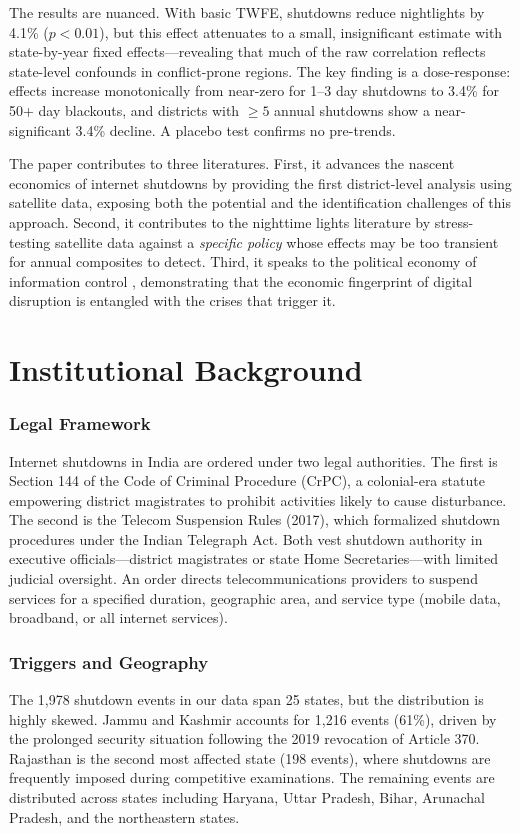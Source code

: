 \documentclass[12pt]{article}
\begin{document}
The results are nuanced. With basic TWFE, shutdowns reduce nightlights by 4.1\% ($p < 0.01$), but this effect attenuates to a small, insignificant estimate with state-by-year fixed effects---revealing that much of the raw correlation reflects state-level confounds in conflict-prone regions. The key finding is a dose-response: effects increase monotonically from near-zero for 1--3 day shutdowns to 3.4\% for 50+ day blackouts, and districts with $\geq 5$ annual shutdowns show a near-significant 3.4\% decline. A placebo test confirms no pre-trends.

The paper contributes to three literatures. First, it advances the nascent economics of internet shutdowns \citep{rysman2024economics, mitra2018internet} by providing the first district-level analysis using satellite data, exposing both the potential and the identification challenges of this approach. Second, it contributes to the nighttime lights literature \citep{henderson2012measuring, asher2021development, michalopoulos2013pre} by stress-testing satellite data against a \emph{specific policy} whose effects may be too transient for annual composites to detect. Third, it speaks to the political economy of information control \citep{yanagizawa2014propaganda, enikolopov2011media}, demonstrating that the economic fingerprint of digital disruption is entangled with the crises that trigger it.


\section{Institutional Background}

\subsubsection*{Legal Framework} Internet shutdowns in India are ordered under two legal authorities. The first is Section 144 of the Code of Criminal Procedure (CrPC), a colonial-era statute empowering district magistrates to prohibit activities likely to cause disturbance. The second is the Telecom Suspension Rules (2017), which formalized shutdown procedures under the Indian Telegraph Act. Both vest shutdown authority in executive officials---district magistrates or state Home Secretaries---with limited judicial oversight. An order directs telecommunications providers to suspend services for a specified duration, geographic area, and service type (mobile data, broadband, or all internet services).

\subsubsection*{Triggers and Geography} The 1,978 shutdown events in our data span 25 states, but the distribution is highly skewed. Jammu and Kashmir accounts for 1,216 events (61\%), driven by the prolonged security situation following the 2019 revocation of Article 370. Rajasthan is the second most affected state (198 events), where shutdowns are frequently imposed during competitive examinations. The remaining events are distributed across states including Haryana, Uttar Pradesh, Bihar, Arunachal Pradesh, and the northeastern states.
\end{document}
